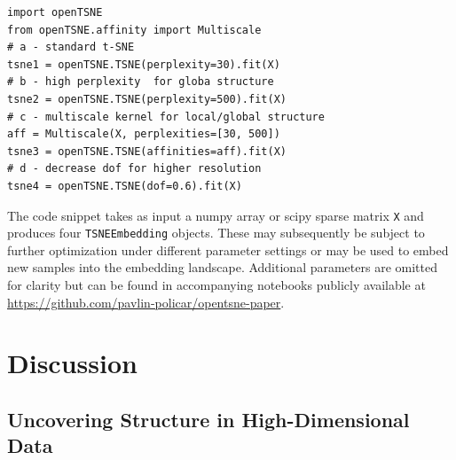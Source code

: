 \documentclass[twocolumn]{bmcart}
\begin{document}
\begin{verbatim}
import openTSNE
from openTSNE.affinity import Multiscale
# a - standard t-SNE
tsne1 = openTSNE.TSNE(perplexity=30).fit(X)
# b - high perplexity  for globa structure
tsne2 = openTSNE.TSNE(perplexity=500).fit(X)
# c - multiscale kernel for local/global structure
aff = Multiscale(X, perplexities=[30, 500])
tsne3 = openTSNE.TSNE(affinities=aff).fit(X)
# d - decrease dof for higher resolution
tsne4 = openTSNE.TSNE(dof=0.6).fit(X)
\end{verbatim}

\noindent The code snippet takes as input a \textsf{numpy} array or \textsf{scipy} sparse matrix \texttt{X} and produces four \texttt{TSNEEmbedding} objects. These may subsequently be subject to further optimization under different parameter settings or may be used to embed new samples into the embedding landscape. Additional parameters are omitted for clarity but can be found in accompanying notebooks publicly available at \url{https://github.com/pavlin-policar/opentsne-paper}.

\section*{Discussion}

\subsection*{Uncovering Structure in High-Dimensional Data}
\end{document}
